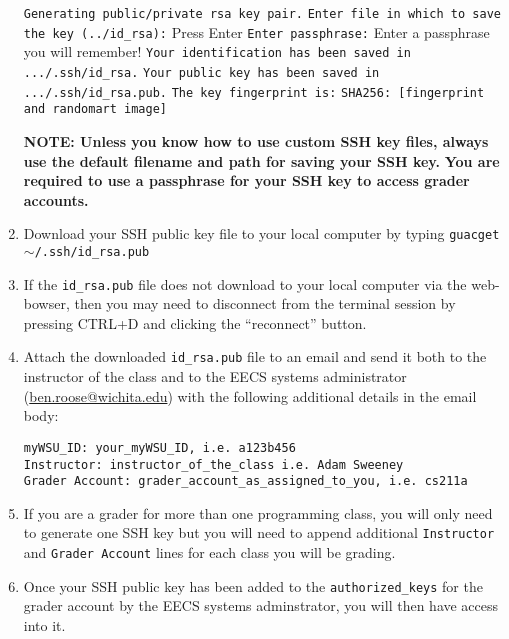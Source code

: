 \documentclass[12pt]{article}
\begin{document}
\begin{flushleft}
\begin{enumerate}
      \texttt{Generating public/private rsa key pair.} \break
      \texttt{Enter file in which to save the key (../id\_rsa):} Press Enter \break
      \texttt{Enter passphrase:} Enter a passphrase you will remember! \break
      \texttt{Your identification has been saved in .../.ssh/id\_rsa.} \break
      \texttt{Your public key has been saved in .../.ssh/id\_rsa.pub.} \break
      \texttt{The key fingerprint is:} \break
      \texttt{SHA256: [fingerprint and randomart image]}
      
      \textbf{NOTE: Unless you know how to use custom SSH key files, always use the default filename and path for saving your SSH key.} \break
      \textbf{You are required to use a passphrase for your SSH key to access grader accounts.}
    
  \item Download your SSH public key file to your local computer by typing \break
    \texttt{guacget $\sim$/.ssh/id\_rsa.pub}
  \item If the \texttt{id\_rsa.pub} file does not download to your local computer via the web-bowser, then you may need to disconnect from the terminal session by pressing CTRL+D and clicking the ``reconnect'' button.
  \item Attach the downloaded \texttt{id\_rsa.pub} file to an email and send it both to the instructor of the class and to the EECS systems administrator (\href{mailto:ben.roose@wichita.edu}{ben.roose@wichita.edu}) with the following additional details in the email body:
\begin{verbatim}
myWSU_ID: your_myWSU_ID, i.e. a123b456
Instructor: instructor_of_the_class i.e. Adam Sweeney
Grader Account: grader_account_as_assigned_to_you, i.e. cs211a
\end{verbatim}
  \item If you are a grader for more than one programming class, you will only need to generate one SSH key but you will need to append additional \texttt{Instructor} and \texttt{Grader Account} lines for each class you will be grading.
 \item Once your SSH public key has been added to the \texttt{authorized\_keys} for the grader account by the EECS systems adminstrator, you will then have access into it.
\end{enumerate}



\end{flushleft}
\end{document}

